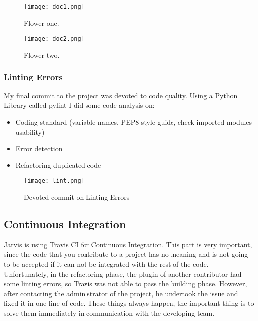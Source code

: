 \documentclass[12pt]{article}
\begin{document}
  \begin{figure}[h]
  \centering
  \begin{minipage}[b]{0.9\textwidth}
    \texttt{[image: doc1.png]}
    \caption{Flower one.}
  \end{minipage}
  \hfill
  \begin{minipage}[b]{0.9\textwidth}
    \texttt{[image: doc2.png]}
    \caption{Flower two.}
  \end{minipage}
\end{figure}
  
  \subsubsection{Linting Errors}
  
 
  
    My final commit to the project was devoted to code quality. Using a Python Library called pylint I did some code analysis on:
    \begin{itemize}
    \item Coding standard (variable names, PEP8 style guide, check imported modules usability)
    \item Error detection
    \item Refactoring duplicated code
    \end{itemize}
    
     \begin{figure}[tph!]
\centerline{\texttt{[image: lint.png]}}
    \caption{Devoted commit on Linting Errors}
    \label{fig:verticalcell}
\end{figure}
    
    
  \subsection{Continuous Integration}
    
    Jarvis is using Travis CI for Continuous Integration. This part is very important, since the code that you contribute to a project has no meaning and is not going to be accepted if it can not be integrated with the rest of the code. Unfortunately, in the refactoring phase, the plugin of another contributor had some linting errors, so Travis was not able to pass the building phase. However, after contacting the administrator of the project, he undertook the issue and fixed it in one line of code. These things always happen, the important thing is to solve them immediately in communication with the developing team.
      
\end{document}
